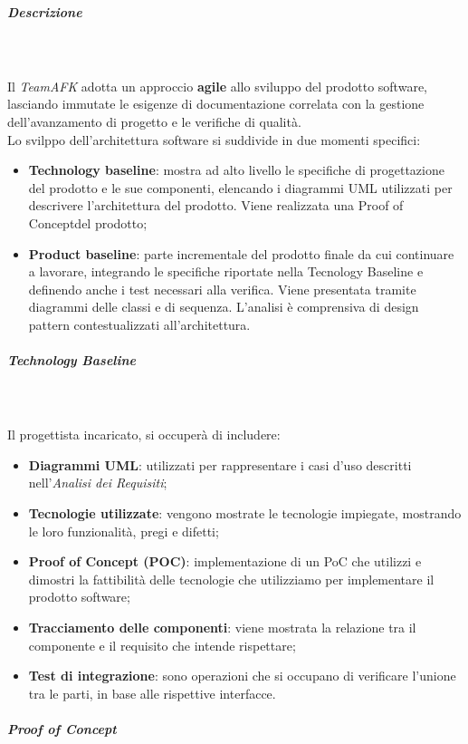 		\subparagraph{Descrizione} \mbox{} \\ \mbox{} \\
		Il \textit{TeamAFK} adotta un approccio \textbf{agile} allo sviluppo del prodotto software, lasciando immutate le esigenze di documentazione correlata con la gestione dell'avanzamento di progetto e le verifiche di qualità. \\
		Lo svilppo dell'architettura software si suddivide in due momenti specifici:
			\begin{itemize}
				\item \textbf{Technology baseline}: mostra ad alto livello le specifiche di progettazione del prodotto e le sue componenti, elencando i diagrammi UML utilizzati per descrivere l'architettura del prodotto. Viene realizzata una Proof of Concept\glo del prodotto;
				\item \textbf{Product baseline}: parte incrementale del prodotto finale da cui continuare a lavorare, integrando le specifiche riportate nella Tecnology Baseline e definendo anche i test necessari alla verifica. Viene presentata tramite diagrammi delle classi e di sequenza. L'analisi è comprensiva di design pattern contestualizzati all'architettura.
			\end{itemize} 
			\subparagraph*{Technology Baseline} \mbox{} \\ \mbox{} \\
			Il progettista incaricato, si occuperà di includere:
			\begin{itemize}
				\item \textbf{Diagrammi UML}: utilizzati per rappresentare i casi d'uso descritti nell'\textit{Analisi dei Requisiti};
				\item \textbf{Tecnologie utilizzate}: vengono mostrate le tecnologie impiegate, mostrando le loro funzionalità, pregi e difetti;
				\item \textbf{Proof of Concept (POC)}: implementazione di un PoC che utilizzi e dimostri la fattibilità delle tecnologie che utilizziamo per implementare il prodotto software;
				\item \textbf{Tracciamento delle componenti}: viene mostrata la relazione tra il componente e il requisito che intende rispettare; 
				\item \textbf{Test di integrazione}: sono operazioni che si occupano di verificare l'unione tra le parti, in base alle rispettive interfacce.
			\end{itemize}
			\subparagraph*{Proof of Concept} \mbox{} \\ \mbox{} \\
